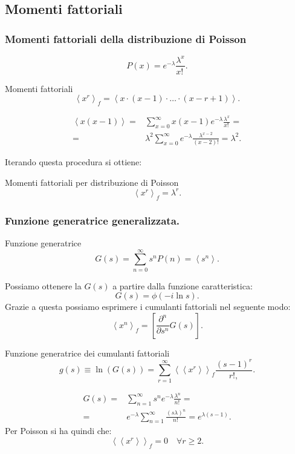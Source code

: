\subsection{Momenti fattoriali}%
\label{sub:Momenti fattoriali}

\subsubsection{Momenti fattoriali della distribuzione di Poisson}%
\label{subsub:Momenti fattoriali della distribuzione di Poisson}
\[
	P(x) = e^{-\lambda } \frac{\lambda^x}{x!\,}
.\] 
\begin{redbox}{Momenti fattoriali}
    \[
	\left<x^r\right>_f = \left<x\cdot (x-1) \cdot \ldots \cdot (x-r+1) \right>
    .\] 
\end{redbox}
\noindent
\begin{exmp}[Poisson con $r=2$.]
   \[\begin{aligned}
       \left<x\left(x-1\right)\right> =& \sum_{x = 0}^{\infty} x\left(x-1\right)e^{-\lambda} \frac{\lambda^x}{x!\,} = \\
       =& \lambda^2 \sum_{x = 0}^{\infty}  e^{-\lambda} \frac{\lambda^{x-2}}{\left(x-2\right)!} = \lambda^2
   .\end{aligned}\]
\end{exmp}
\noindent
Iterando questa procedura si ottiene:
\begin{bluebox}{Momenti fattoriali per distribuzione di Poisson}
 \[
    \left<x^r\right>_f = \lambda^r
.\]    
\end{bluebox}
\noindent

\subsubsection{Funzione generatrice generalizzata.}%
\label{subsub:Funzione generatrice generalizzata.}

\begin{redbox}{Funzione generatrice}
    \[
	G(s) = \sum_{n=0}^{\infty} s^n P(n) = \left<s^n\right>
    .\] 
\end{redbox}
\noindent
Possiamo ottenere la $G(s)$ a partire dalla funzione caratteristica:
\[
    G(s) = \phi (-i\ln s) 
.\] 
Grazie a questa possiamo esprimere i cumulanti fattoriali nel seguente modo:
\[
\left<x^n\right>_f = \left[\frac{\partial^n}{\partial s^n} G(s)\right]
.\] 
\begin{bluebox}{Funzione generatrice dei cumulanti fattoriali}
    \[
	g(s) \equiv \ln (G(s)) = \sum_{r=1}^{\infty} \left<\left<x^r\right>\right>_f \frac{\left(s-1\right)^r}{r!,}
    .\] 
\end{bluebox}
\noindent
\begin{exmp}
    \[\begin{aligned}
	G(s) =& \sum_{n=1}^{\infty} s^n e^{-\lambda} \frac{\lambda^n}{n!\,} =\\
	=& e^{-\lambda}\sum_{n=1}^{\infty} \frac{\left(s\lambda\right)^n}{n!\,} =  e^{\lambda (s-1) }
     .\end{aligned}\]
     Per Poisson si ha quindi che:
     \[
         \left<\left<x^r\right>\right>_f = 0 \quad \forall r \ge  2
     .\] 
\end{exmp}
\noindent

